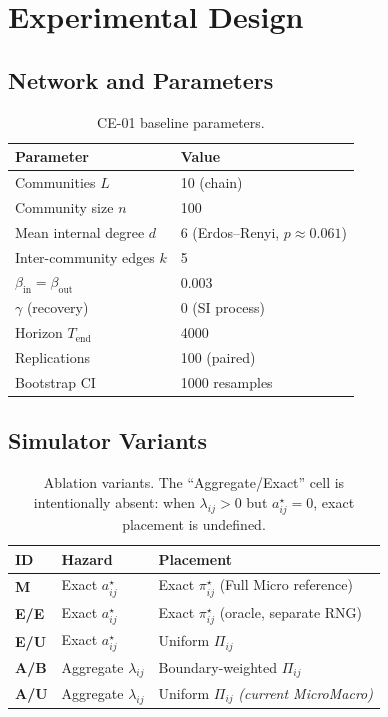 \documentclass[11pt,a4paper]{article}
\begin{document}
\section{Experimental Design}

\subsection{Network and Parameters}

\begin{table}[H]
\centering
\begin{tabular}{ll}
\toprule
Parameter & Value \\
\midrule
Communities $L$ & 10 (chain) \\
Community size $n$ & 100 \\
Mean internal degree $d$ & 6 (Erdos--Renyi, $p \approx 0.061$) \\
Inter-community edges $k$ & 5 \\
$\beta_{\mathrm{in}} = \beta_{\mathrm{out}}$ & 0.003 \\
$\gamma$ (recovery) & 0 (SI process) \\
Horizon $T_{\mathrm{end}}$ & 4000 \\
Replications & 100 (paired) \\
Bootstrap CI & 1000 resamples \\
\bottomrule
\end{tabular}
\caption{CE-01 baseline parameters.}
\end{table}

\subsection{Simulator Variants}

\begin{table}[H]
\centering
\begin{tabular}{lll}
\toprule
ID & Hazard & Placement \\
\midrule
\textbf{M}   & Exact $a^{\star}_{ij}$ & Exact $\pi^{\star}_{ij}$ (Full Micro reference) \\
\textbf{E/E} & Exact $a^{\star}_{ij}$ & Exact $\pi^{\star}_{ij}$ (oracle, separate RNG) \\
\textbf{E/U} & Exact $a^{\star}_{ij}$ & Uniform $\Pi_{ij}$ \\
\textbf{A/B} & Aggregate $\lambda_{ij}$ & Boundary-weighted $\Pi_{ij}$ \\
\textbf{A/U} & Aggregate $\lambda_{ij}$ & Uniform $\Pi_{ij}$ \emph{(current MicroMacro)} \\
\bottomrule
\end{tabular}
\caption{Ablation variants. The ``Aggregate/Exact'' cell is intentionally absent:
when $\lambda_{ij}>0$ but $a^{\star}_{ij}=0$, exact placement is undefined.}
\end{table}
\end{document}
